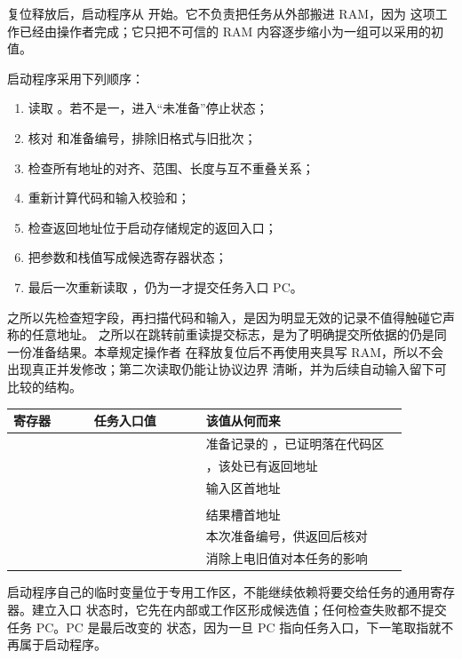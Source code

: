 复位释放后，启动程序从  开始。它不负责把任务从外部搬进 RAM，因为
这项工作已经由操作者完成；它只把不可信的 RAM 内容逐步缩小为一组可以采用的初值。


启动程序采用下列顺序：

\begin{enumerate}
\item 读取 。若不是一，进入“未准备”停止状态；
\item 核对  和准备编号，排除旧格式与旧批次；
\item 检查所有地址的对齐、范围、长度与互不重叠关系；
\item 重新计算代码和输入校验和；
\item 检查返回地址位于启动存储规定的返回入口；
\item 把参数和栈值写成候选寄存器状态；
\item 最后一次重新读取 ，仍为一才提交任务入口 PC。
\end{enumerate}

之所以先检查短字段，再扫描代码和输入，是因为明显无效的记录不值得触碰它声称的任意地址。
之所以在跳转前重读提交标志，是为了明确提交所依据的仍是同一份准备结果。本章规定操作者
在释放复位后不再使用夹具写 RAM，所以不会出现真正并发修改；第二次读取仍能让协议边界
清晰，并为后续自动输入留下可比较的结构。


\begin{longtable}{|L{0.18\linewidth}|L{0.25\linewidth}|L{0.45\linewidth}|}
\hline
{}
寄存器 & 任务入口值 & 该值从何而来 \\ \hline
{} &  & 准备记录的 ，已证明落在代码区 \\ \hline
{} &  & ，该处已有返回地址 \\ \hline
{} &  & 输入区首地址 \\ \hline
{} &  &  \\ \hline
{} &  & 结果槽首地址 \\ \hline
{} &  & 本次准备编号，供返回后核对 \\ \hline
{} &  & 消除上电旧值对本任务的影响 \\ \hline
\end{longtable}

启动程序自己的临时变量位于专用工作区，不能继续依赖将要交给任务的通用寄存器。建立入口
状态时，它先在内部或工作区形成候选值；任何检查失败都不提交任务 PC。PC 是最后改变的
状态，因为一旦 PC 指向任务入口，下一笔取指就不再属于启动程序。

